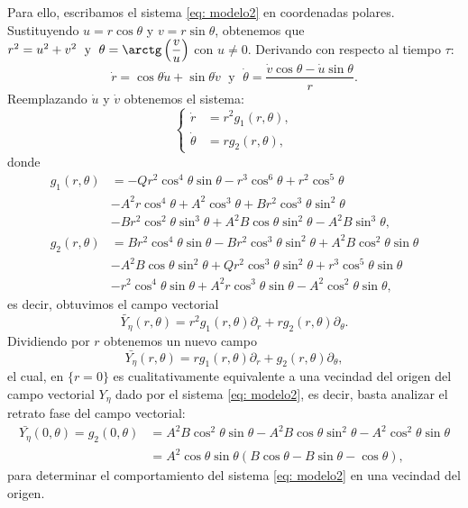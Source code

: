 \noindent Para ello, escribamos el sistema \eqref{eq: modelo2} en coordenadas polares. Sustituyendo $u = r \cos\theta$ y $v = r \sin\theta$, obtenemos que $r^{2}=u^{2}+v^{2} \;\text{ y }\; \theta = \arctg\left(\dfrac{v}{u}\right)$ con $u\neq0$. Derivando con respecto al tiempo $\tau$: $$\dot{r}=\cos\theta\dot{u} + \sin\theta\dot{v} \;\text{ y }\; \dot{\theta}=\dfrac{\dot{v}\cos\theta-\dot{u}\sin\theta}{r}.$$ Reemplazando $\dot{u}$ y $\dot{v}$ obtenemos el sistema:
\begin{equation*}
	\begin{cases}
		\dot{r} &= r^{2} g_1(r, \theta), \\
		\dot{\theta} &= r g_2(r, \theta),
	\end{cases}
\end{equation*}
donde
\begin{equation*}
	\begin{aligned}
		g_1(r, \theta) &= -Qr^{2}\cos^{4}\theta\sin\theta- r^{3}\cos^{6}\theta+ r^{2}\cos^{5}\theta \\ &-A^{2}r\cos^{4}\theta+ A^{2}\cos^{3}\theta + Br^{2}\cos^{3}\theta\sin^{2}\theta \\ &-Br^{2}\cos^{2}\theta\sin^{3}\theta+ A^{2}B\cos\theta\sin^{2}\theta- A^{2}B\sin^{3}\theta,
		\\
		g_2(r, \theta) &= Br^{2}\cos^{4}\theta\sin\theta- Br^{2}\cos^{3}\theta\sin^{2}\theta+ A^{2}B\cos^{2}\theta\sin\theta \\ &-A^{2}B\cos\theta\sin^{2}\theta+ Qr^{2}\cos^{3}\theta\sin^{2}\theta + r^{3}\cos^{5}\theta\sin\theta \\ &-r^{2}\cos^{4}\theta\sin\theta+ A^{2}r\cos^{3}\theta\sin\theta- A^{2}\cos^{2}\theta\sin\theta,
	\end{aligned}
\end{equation*}
es decir, obtuvimos el campo vectorial $$\tilde{Y_{\eta}}(r,\theta) = r^{2}g_1(r,\theta) \partial_r + rg_2(r,\theta) \partial_\theta.$$ Dividiendo por $r$ obtenemos un nuevo campo $$\bar{Y_{\eta}}(r,\theta) = rg_1(r,\theta) \partial_r + g_2(r,\theta) \partial_\theta,$$ el cual, en $\{r=0\}$ es cualitativamente equivalente a una vecindad del origen del campo vectorial $Y_{\eta}$ dado por el sistema \eqref{eq: modelo2}, es decir, basta analizar el retrato fase del campo vectorial:
\begin{equation*}
	\begin{aligned}
		\bar{Y_{\eta}}(0,\theta) = g_2(0, \theta) &= A^{2}B\cos^{2}\theta\sin\theta - A^{2}B\cos\theta\sin^{2}\theta- A^{2}\cos^{2}\theta\sin\theta \\
		&= A^{2}\cos\theta\sin\theta (B\cos\theta-B\sin\theta-\cos\theta),
	\end{aligned}
\end{equation*}
para determinar el comportamiento del sistema \eqref{eq: modelo2} en una vecindad del origen. \\

